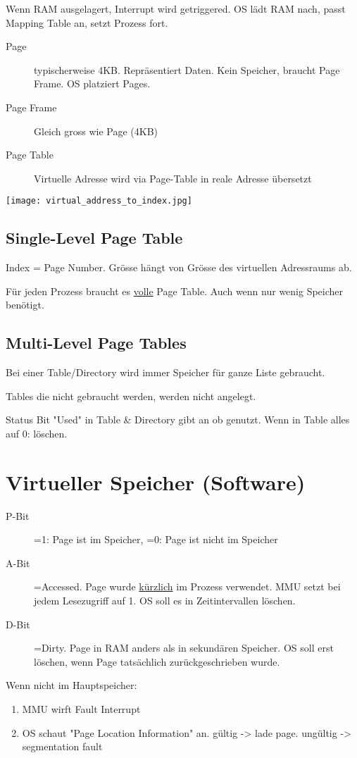 \begin{multicols*}{4}
Wenn RAM ausgelagert, Interrupt wird getriggered. OS lädt RAM nach, passt Mapping Table an, setzt Prozess fort.

\begin{description}
    \item[Page] typischerweise 4KB. Repräsentiert Daten. Kein Speicher, braucht Page Frame. OS platziert Pages.
    \item[Page Frame] Gleich gross wie Page (4KB)
    \item[Page Table] Virtuelle Adresse wird via Page-Table in reale Adresse übersetzt
\end{description}
\texttt{[image: virtual\_address\_to\_index.jpg]}

\subsection{Single-Level Page Table}
Index = Page Number. Grösse hängt von Grösse des virtuellen Adressraums ab.

Für jeden Prozess braucht es \underline{volle} Page Table. Auch wenn nur wenig Speicher benötigt.

\subsection{Multi-Level Page Tables}
Bei einer Table/Directory wird immer Speicher für ganze Liste gebraucht.

Tables die nicht gebraucht werden, werden nicht angelegt.

Status Bit "Used" in Table \& Directory gibt an ob genutzt. Wenn in Table alles auf 0: löschen.

\section{Virtueller Speicher (Software)}
\begin{description}
    \item[P-Bit] =1: Page ist im Speicher, =0: Page ist nicht im Speicher
    \item[A-Bit] =Accessed. Page wurde \underline{kürzlich} im Prozess verwendet. MMU setzt bei jedem Lesezugriff auf 1. OS soll es in Zeitintervallen löschen.
    \item[D-Bit] =Dirty. Page in RAM anders als in sekundären Speicher. OS soll erst löschen, wenn Page tatsächlich zurückgeschrieben wurde.
\end{description}
\vspace{2pt}
Wenn nicht im Hauptspeicher:
\begin{enumerate}
    \item MMU wirft Fault Interrupt
    \item OS schaut "Page Location Information" an. gültig -> lade page. ungültig -> segmentation fault
\end{enumerate}


\end{multicols*}
